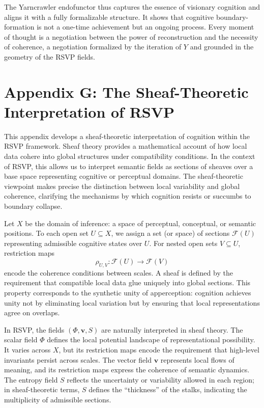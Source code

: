 \documentclass[12pt]{article}
\begin{document}
The Yarncrawler endofunctor thus captures the essence of visionary cognition 
and aligns it with a fully formalizable structure.  It shows that cognitive 
boundary-formation is not a one-time achievement but an ongoing process.  
Every moment of thought is a negotiation between the power of reconstruction 
and the necessity of coherence, a negotiation formalized by the iteration of 
$Y$ and grounded in the geometry of the RSVP fields.

\newpage
\section*{Appendix G: The Sheaf-Theoretic Interpretation of RSVP}

This appendix develops a sheaf-theoretic interpretation of cognition within the 
RSVP framework.  Sheaf theory provides a mathematical account of how local data 
cohere into global structures under compatibility conditions.  In the context of 
RSVP, this allows us to interpret semantic fields as sections of sheaves over a 
base space representing cognitive or perceptual domains.  
The sheaf-theoretic viewpoint makes precise the distinction between local 
variability and global coherence, clarifying the mechanisms by which cognition 
resists or succumbs to boundary collapse.

Let $X$ be the domain of inference: a space of perceptual, conceptual, or 
semantic positions.  To each open set $U \subseteq X$, we assign a set (or 
space) of sections $\mathcal{F}(U)$ representing admissible cognitive states 
over $U$.  For nested open sets $V \subseteq U$, restriction maps
\[
\rho_{U,V} : \mathcal{F}(U) \longrightarrow \mathcal{F}(V)
\]
encode the coherence conditions between scales.  
A sheaf is defined by the requirement that compatible local data glue uniquely 
into global sections.  
This property corresponds to the synthetic unity of apperception: cognition 
achieves unity not by eliminating local variation but by ensuring that local 
representations agree on overlaps.

In RSVP, the fields $(\Phi, \mathbf{v}, S)$ are naturally interpreted in sheaf 
theory.  The scalar field $\Phi$ defines the local potential landscape of 
representational possibility.  It varies across $X$, but its restriction maps 
encode the requirement that high-level invariants persist across scales.  
The vector field $\mathbf{v}$ represents local flows of meaning, and its 
restriction maps express the coherence of semantic dynamics.  
The entropy field $S$ reflects the uncertainty or variability allowed in each 
region; in sheaf-theoretic terms, $S$ defines the “thickness” of the stalks, 
indicating the multiplicity of admissible sections.
\end{document}
